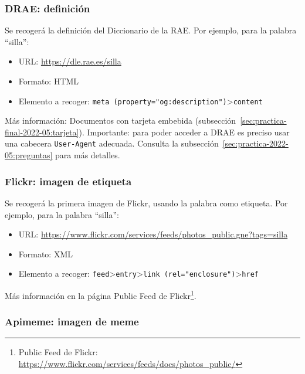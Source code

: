 \subsubsection{DRAE: definición}

Se recogerá la definición del Diccionario de la RAE. Por ejemplo, para la palabra ``silla'':

\begin{itemize}
\item URL: \url{https://dle.rae.es/silla}
\item Formato: HTML
\item Elemento a recoger: \texttt{meta (property="og:description")}>\texttt{content}
\end{itemize}

Más información: Documentos con tarjeta embebida (subsección~\ref{sec:practica-final-2022-05:tarjeta}). Importante: para poder acceder a DRAE es preciso usar una cabecera \texttt{User-Agent} adecuada. Consulta la subsección~\ref{sec:practica-2022-05:preguntas} para más detalles.

\subsubsection{Flickr: imagen de etiqueta}

Se recogerá la primera imagen de Flickr, usando la palabra como etiqueta. Por ejemplo, para la palabra ``silla'':

\begin{itemize}
\item URL: \url{https://www.flickr.com/services/feeds/photos_public.gne?tags=silla}
\item Formato: XML
\item Elemento a recoger: \texttt{feed}>\texttt{entry}>\texttt{link (rel="enclosure")}>\texttt{href}
\end{itemize}

Más información en la página Public Feed de Flickr\footnote{Public Feed de Flickr: \\ \url{https://www.flickr.com/services/feeds/docs/photos_public/}}.

\subsubsection{Apimeme: imagen de meme}

